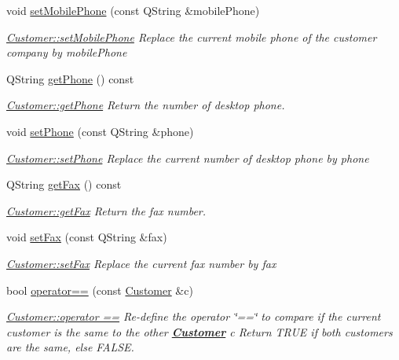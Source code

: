 \begin{DoxyCompactItemize}
void \hyperlink{classCustomer_aec562d504cd6c6e3db153544b102e028}{set\-Mobile\-Phone} (const Q\-String \&mobile\-Phone)
\begin{DoxyCompactList}\small\item\em \hyperlink{classCustomer_aec562d504cd6c6e3db153544b102e028}{Customer\-::set\-Mobile\-Phone} Replace the current mobile phone of the customer company by {\itshape mobile\-Phone} \end{DoxyCompactList}\item 
Q\-String \hyperlink{classCustomer_a20b37c158f138def2014f24f291f2aa0}{get\-Phone} () const 
\begin{DoxyCompactList}\small\item\em \hyperlink{classCustomer_a20b37c158f138def2014f24f291f2aa0}{Customer\-::get\-Phone} Return the number of desktop phone. \end{DoxyCompactList}\item 
void \hyperlink{classCustomer_a850d6e8e1a061362928de94553cb12a6}{set\-Phone} (const Q\-String \&phone)
\begin{DoxyCompactList}\small\item\em \hyperlink{classCustomer_a850d6e8e1a061362928de94553cb12a6}{Customer\-::set\-Phone} Replace the current number of desktop phone by {\itshape phone} \end{DoxyCompactList}\item 
Q\-String \hyperlink{classCustomer_ab982339f461136ce230740d776a98ae9}{get\-Fax} () const 
\begin{DoxyCompactList}\small\item\em \hyperlink{classCustomer_ab982339f461136ce230740d776a98ae9}{Customer\-::get\-Fax} Return the fax number. \end{DoxyCompactList}\item 
void \hyperlink{classCustomer_a29049b62abb6aa0733c5def198ed62e5}{set\-Fax} (const Q\-String \&fax)
\begin{DoxyCompactList}\small\item\em \hyperlink{classCustomer_a29049b62abb6aa0733c5def198ed62e5}{Customer\-::set\-Fax} Replace the current fax number by {\itshape fax} \end{DoxyCompactList}\item 
bool \hyperlink{classCustomer_ae55c14b91c08ba15c9593a47931d1949}{operator==} (const \hyperlink{classCustomer}{Customer} \&c)
\begin{DoxyCompactList}\small\item\em \hyperlink{classCustomer_ae55c14b91c08ba15c9593a47931d1949}{Customer\-::operator ==} Re-\/define the operator \char`\"{}==\char`\"{} to compare if the current customer is the same to the other {\bfseries \hyperlink{classCustomer}{Customer}} {\itshape c} Return T\-R\-U\-E if both customers are the same, else F\-A\-L\-S\-E. \end{DoxyCompactList}\item 

\end{DoxyCompactItemize}
